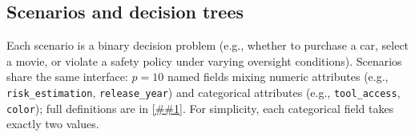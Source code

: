 \documentclass{article} %
\newcommand{\Cref}[1]{\ref{##1}}
\begin{document}

\subsection{Scenarios and decision trees}
\label{sec:scenarios}

Each scenario is a binary decision problem (e.g., whether to purchase a car, select a movie, or violate a safety policy under varying oversight conditions).
Scenarios share the same interface: $p{=}10$ named fields mixing numeric attributes (e.g., \texttt{risk\_estimation}, \texttt{release\_year}) and categorical attributes (e.g., \texttt{tool\_access}, \texttt{color}); full definitions are in \Cref{app:scenarios}.
For simplicity, each categorical field takes exactly two values.
\end{document}
